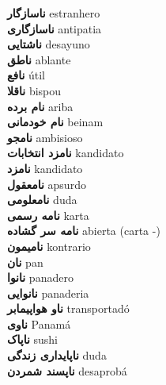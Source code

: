 \textbf{ ناسازگار  } estranhero \\
\textbf{ ناسازگاری  } antipatia \\
\textbf{ ناشتایی  } desayuno \\
\textbf{ ناطق  } ablante \\
\textbf{ نافع  } útil \\
\textbf{ ناقلا  } bispou \\
\textbf{ نام برده  } ariba \\
\textbf{ نام خودمانی  } beinam \\
\textbf{ نامجو  } ambisioso \\
\textbf{ نامزد انتخابات  } kandidato \\
\textbf{ نامزد  } kandidato \\
\textbf{ نامعقول  } apsurdo \\
\textbf{ نامعلومی  } duda \\
\textbf{ نامه رسمی  } karta \\
\textbf{ نامه سر گشاده  } abierta (carta -) \\
\textbf{ نامیمون  } kontrario \\
\textbf{ نان  } pan \\
\textbf{ نانوا  } panadero \\
\textbf{ نانوایی  } panaderia \\
\textbf{ ناو هواپیمابر  } transportadó \\
\textbf{ ناوی  } Panamá \\
\textbf{ ناپاک  } sushi \\
\textbf{ ناپایداری زندگی  } duda \\
\textbf{ ناپسند شمردن  } desaprobá \\
